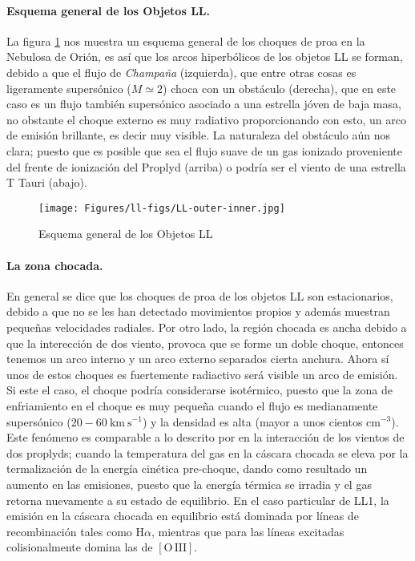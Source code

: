 \documentclass{article}
\newcommand\U[1]{\ensuremath{\mathrm{#1}}}
\newcommand\cm{\U{cm}}
\newcommand\ha{\ensuremath{\mathrm{H}\alpha}}
\newcommand\oiii{\ensuremath{\mathrm{[O\,III]}}}
\begin{document}
\paragraph{Esquema general de los Objetos LL.} La figura \ref{fig:esquema-arcos} nos muestra un esquema general de los choques de proa en la Nebulosa de Orión, es así que los arcos hiperbólicos de los objetos LL se forman, debido a que el flujo de \textit{Champaña} (izquierda), que entre otras cosas es ligeramente supersónico (\(M\simeq2\)) choca con un obstáculo (derecha), que en este caso es un flujo también supersónico asociado a una estrella jóven de baja masa, no obstante el choque externo es muy radiativo proporcionando con esto, un arco de emisión brillante, es decir muy visible. La naturaleza del obstáculo aún nos clara; puesto que  es posible que sea el flujo suave de un gas ionizado proveniente del frente de ionización del Proplyd (arriba) o podría ser el viento de una estrella T Tauri (abajo).\\ 

\begin{figure}
  \centering
  \texttt{[image: Figures/ll-figs/LL-outer-inner.jpg]}
  \caption{Esquema general de los Objetos LL}
  \label{fig:esquema-arcos}
\end{figure}

\paragraph{La zona chocada.} En general se dice que los choques de proa de los objetos LL son estacionarios, debido a que no se les han detectado movimientos propios y además muestran pequeñas velocidades radiales. Por otro lado, la región chocada es ancha debido a que la interección de dos viento, provoca que se forme un doble choque, entonces tenemos un arco interno y un arco externo separados cierta anchura. Ahora sí unos de estos choques es fuertemente radiactivo será visible un arco de emisión. Si este el caso, el choque podría considerarse isotérmico, puesto que la  zona de enfriamiento en el choque es muy pequeña cuando el flujo es medianamente supersónico (\(20-60~\text{km}~\text{s}^{-1}\)) y la densidad es alta (mayor a unos cientos \(\cm^{-3}\)). Este fenómeno es comparable a lo descrito por \citet{Henney:2002} en la interacción de los vientos de dos proplyds; cuando la temperatura del gas en la cáscara chocada se eleva por la termalización de la energía cinética pre-choque, dando como resultado un aumento en las emisiones, puesto que la energía térmica se irradia y el gas retorna nuevamente a su estado de equilibrio. En el caso particular de LL1, la emisión en la cáscara chocada en equilibrio está dominada por líneas de recombinación tales como \ha{}, mientras que para las líneas excitadas colisionalmente domina las de \oiii{}. \\ 
\end{document}
